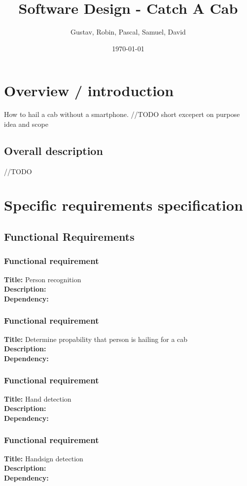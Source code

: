 \documentclass[12pt]{book}
\title{Software Design - Catch A Cab }
\author{Gustav, Robin, Pascal, Samuel, David}
\date{\today}
\begin{document}
\maketitle


\chapter{Overview / introduction}
How to hail a cab without a smartphone.
//TODO short excepert on purpose idea and scope

\section{Overall description}
//TODO

\chapter{Specific requirements specification}
\section{Functional Requirements}

\subsection{Functional requirement} 
\textbf{Title:} Person recognition \\
\textbf{Description:} \\
\textbf{Dependency:} 

\subsection{Functional requirement} 
\textbf{Title:} Determine propability that person is hailing for a cab\\
\textbf{Description:} \\
\textbf{Dependency:}

\subsection{Functional requirement} 
\textbf{Title:} Hand detection \\
\textbf{Description:} \\
\textbf{Dependency:}

\subsection{Functional requirement} 
\textbf{Title:} Handsign detection\\
\textbf{Description:} \\
\textbf{Dependency:}
\end{document}
